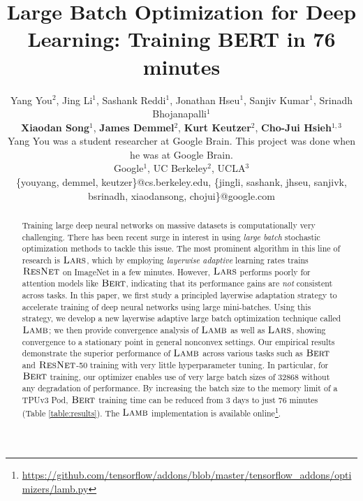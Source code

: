 \documentclass{article} \usepackage{iclr2020_conference,times}
\title{Large Batch Optimization for Deep Learning: Training BERT in 76 minutes}
\author{\small Yang You$^{2}$, 
Jing Li$^{1}$, Sashank Reddi$^{1}$, Jonathan Hseu$^{1}$, Sanjiv Kumar$^{1}$, Srinadh Bhojanapalli$^{1}$\\{\bf \small Xiaodan Song}$^{1}$, {\bf \small James Demmel}$^{2}$, {\bf \small Kurt Keutzer}$^{2}$, {\bf \small Cho-Jui Hsieh}$^{1,3}$\\
{\scriptsize Yang You was a student researcher at Google Brain. This project was done when he was at Google Brain.}
\\
\normalsize{Google$^{1}$},
\normalsize{UC Berkeley$^{2}$},
\normalsize{UCLA$^{3}$}\\
\scriptsize{\{youyang, demmel, keutzer\}@cs.berkeley.edu, \{jingli, sashank, jhseu, sanjivk, bsrinadh, xiaodansong, chojui\}@google.com}
}
\newcommand{\resnet}{\textsc{ResNet}}
\newcommand{\bert}{\textsc{Bert}\xspace}
\newcommand{\lamb}{\textsc{Lamb}}
\newcommand{\lars}{\textsc{Lars}}
\begin{document}
\maketitle

\begin{abstract}
Training large deep neural networks on massive datasets is  computationally very challenging. There has been recent surge in interest in using \emph{large batch} stochastic optimization methods to tackle this issue. The most prominent algorithm in this line of research is $\lars$, which by  employing \emph{layerwise adaptive} learning rates trains $\resnet$ on ImageNet in a few minutes. However, $\lars$ performs poorly for attention models like $\bert$, indicating that its performance gains are \emph{not} consistent across tasks. In this paper, we first study a principled layerwise adaptation strategy to accelerate training of deep neural networks using large mini-batches. Using this strategy, we develop a new layerwise adaptive large batch optimization technique called $\lamb$; we then provide convergence analysis of $\lamb$ as well as $\lars$, showing convergence to a stationary point in general nonconvex settings. Our empirical results demonstrate the superior performance of $\lamb$ across various tasks such as $\bert$ and $\resnet$-50 training with very little hyperparameter tuning. In particular, for $\bert$ training, our optimizer enables use of very large batch sizes of 32868 without any degradation of performance.  By increasing the batch size to the memory limit of a TPUv3 Pod, $\bert$ training time can be reduced from 3 days to just 76 minutes (Table \ref{table:results}). The $\lamb$ implementation is available online\footnote{\url{https://github.com/tensorflow/addons/blob/master/tensorflow_addons/optimizers/lamb.py}}.
\end{abstract}

\iffalse
Training large deep neural networks on massive datasets is  computationally very challenging. There has been recent surge in interest in using \emph{large batch} stochastic optimization methods to tackle this issue. The use of large batch of gradients (which are computed in parallel) in these methods enable them to use much larger learning rates, thereby, drastically reducing the training time. However, current methods require extensive tuning of learning rates and their performance gains are \emph{not} consistent across tasks. In this paper, we study a principled adaptation strategy to accelerate training of deep neural networks using large mini-batches. Using this strategy, we develop a new layer-wise adaptive large batch optimization technique called $\lamb$. We provide a formal convergence analysis of $\lamb$ as well as the previous published layerwise optimizer $\lars$, showing convergence to a stationary point in general nonconvex settings. Our empirical results demonstrate the superior performance of $\lamb$ across various tasks such as BERT and ResNet-50 training with very little tuning. In particular, for BERT training, our optimizer enables use of very large batch sizes of 32868 without any degradation of performance.  By increasing the batch size to the memory limit of a TPUv3 Pod, BERT training time can be reduced from 3 days to just 76 minutes (Table \ref{table:results}).
\fi
\end{document}
